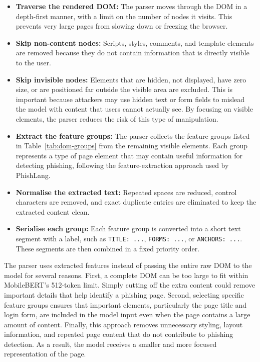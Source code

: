 \documentclass{FastFyp}
\begin{document}
\begin{itemize}
    \item \textbf{Traverse the rendered DOM:} The parser moves through the DOM in a depth-first manner, with a limit on the number of nodes it visits. This prevents very large pages from slowing down or freezing the browser.

    \item \textbf{Skip non-content nodes:} Scripts, styles, comments, and template elements are removed because they do not contain information that is directly visible to the user.

    \item \textbf{Skip invisible nodes:} Elements that are hidden, not displayed, have zero size, or are positioned far outside the visible area are excluded. This is important because attackers may use hidden text or form fields to mislead the model with content that users cannot actually see. By focusing on visible elements, the parser reduces the risk of this type of manipulation.

    \item \textbf{Extract the feature groups:} The parser collects the feature groups listed in Table~\ref{tab:dom-groups} from the remaining visible elements. Each group represents a type of page element that may contain useful information for detecting phishing, following the feature-extraction approach used by PhishLang.

    \item \textbf{Normalise the extracted text:} Repeated spaces are reduced, control characters are removed, and exact duplicate entries are eliminated to keep the extracted content clean.

    \item \textbf{Serialise each group:} Each feature group is converted into a short text segment with a label, such as \texttt{TITLE: ...}, \texttt{FORMS: ...}, or \texttt{ANCHORS: ...}. These segments are then combined in a fixed priority order.
\end{itemize}

The parser uses extracted features instead of passing the entire raw DOM to the model for several reasons. First, a complete DOM can be too large to fit within MobileBERT's 512-token limit. Simply cutting off the extra content could remove important details that help identify a phishing page. Second, selecting specific feature groups ensures that important elements, particularly the page title and login form, are included in the model input even when the page contains a large amount of content. Finally, this approach removes unnecessary styling, layout information, and repeated page content that do not contribute to phishing detection. As a result, the model receives a smaller and more focused representation of the page.
\end{document}
